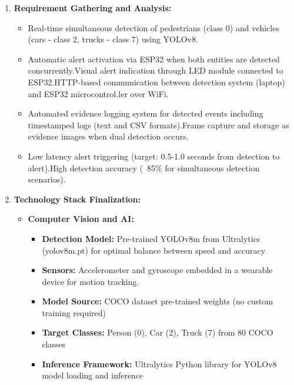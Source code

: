 \documentclass[a4paper, 12pt]{report}
\begin{document}
\begin{enumerate}[itemsep=-4pt, label=\textbf{\roman*.}]
    \item \textbf{Requirement Gathering and Analysis: }
    \vspace{-4pt}
    \begin{itemize}[itemsep=-4pt]
        \item Real-time simultaneous detection of pedestrians (class 0) and vehicles (cars - class 2, trucks - class 7) using YOLOv8.
        \item Automatic alert activation via ESP32 when both entities are detected concurrently.Visual alert indication through LED module connected to ESP32.HTTP-based communication between detection system (laptop) and ESP32 microcontrol.ler over WiFi.
        \item Automated evidence logging system for detected events including timestamped logs (text and CSV formats).Frame capture and storage as evidence images when dual detection occurs.
        \item Low latency alert triggering (target: 0.5-1.0 seconds from detection to alert).High detection accuracy (~85\% for simultaneous detection scenarios).

    \end{itemize}

    \item \textbf{Technology Stack Finalization: }
    \vspace{-4pt}
    \begin{itemize}
        \item \textbf{Computer Vision and AI:}
        \vspace{-4pt}
        \begin{itemize}[itemsep=-4pt]
        \item \textbf{Detection Model:} Pre-trained YOLOv8m from Ultralytics (yolov8m.pt) for optimal balance between speed and accuracy
        \item \textbf{Sensors:} Accelerometer and gyroscope embedded in a wearable device for motion tracking.
        \item \textbf{Model Source:} COCO dataset pre-trained weights (no custom training required)
        \item \textbf{Target Classes:} Person (0), Car (2), Truck (7) from 80 COCO classes
        \item \textbf{Inference Framework:} Ultralytics Python library for YOLOv8 model loading and inference
        \end{itemize}
        

\end{itemize}
\end{enumerate}
\end{document}
